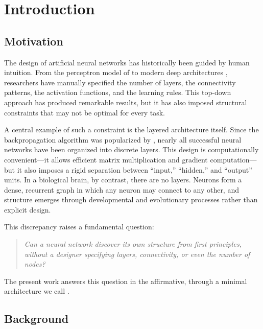
\chapter{Introduction}
\label{ch:introduction}

\section{Motivation}

The design of artificial neural networks has historically been guided by
human intuition. From the perceptron model of \citet{rosenblatt1958perceptron}
to modern deep architectures \citep{lecun2015deep}, researchers have manually
specified the number of layers, the connectivity patterns, the activation
functions, and the learning rules. This top-down approach has produced
remarkable results, but it has also imposed structural constraints that may
not be optimal for every task.

A central example of such a constraint is the layered architecture itself.
Since the backpropagation algorithm was popularized by
\citet{rumelhart1986learning}, nearly all successful neural networks have
been organized into discrete layers. This design is computationally
convenient---it allows efficient matrix multiplication and gradient
computation---but it also imposes a rigid separation between
``input,'' ``hidden,'' and ``output'' units. In a biological brain, by
contrast, there are no layers. Neurons form a dense, recurrent graph in
which any neuron may connect to any other, and structure emerges through
developmental and evolutionary processes rather than explicit design.

This discrepancy raises a fundamental question:

\begin{quote}
\emph{Can a neural network discover its own structure from first
principles, without a designer specifying layers, connectivity, or even
the number of nodes?}
\end{quote}

The present work answers this question in the affirmative, through a
minimal architecture we call \modnet{}.

\section{Background}

